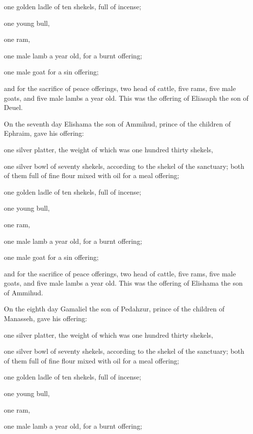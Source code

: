 {\par }{\PP {}one golden ladle of ten shekels, full of incense;
\par }{\PP {}one young bull,
\par }{\PP one ram,
\par }{\PP one male lamb a year old, for a burnt offering;
\par }{\PP {}one male goat for a sin offering;
\par }{\PP {}and for the sacrifice of peace offerings, two head of cattle, five rams, five male goats, and five male lambs a year old. This was the offering of Eliasaph the son of Deuel.
\par }{\PP {}On the seventh day Elishama the son of Ammihud, prince of the children of Ephraim,
gave his offering:
\par }{\PP one silver platter, the weight of which was one hundred thirty shekels,
\par }{\PP one silver bowl of seventy shekels, according to the shekel of the sanctuary; both of them full of fine flour mixed with oil for a meal offering;
\par }{\PP {}one golden ladle of ten shekels, full of incense;
\par }{\PP {}one young bull,
\par }{\PP one ram,
\par }{\PP one male lamb a year old, for a burnt offering;
\par }{\PP {}one male goat for a sin offering;
\par }{\PP {}and for the sacrifice of peace offerings, two head of cattle, five rams, five male goats, and five male lambs a year old. This was the offering of Elishama the son of Ammihud.
\par }{\PP {}On the eighth day Gamaliel the son of Pedahzur, prince of the children of Manasseh,
gave his offering:
\par }{\PP one silver platter, the weight of which was one hundred thirty shekels,
\par }{\PP one silver bowl of seventy shekels, according to the shekel of the sanctuary; both of them full of fine flour mixed with oil for a meal offering;
\par }{\PP {}one golden ladle of ten shekels, full of incense;
\par }{\PP {}one young bull,
\par }{\PP one ram,
\par }{\PP one male lamb a year old, for a burnt offering;
}
